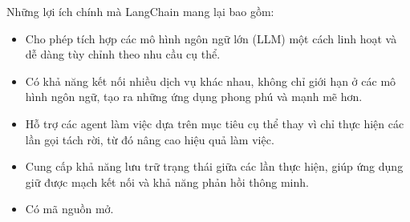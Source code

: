 Những lợi ích chính mà LangChain mang lại bao gồm:
\begin{itemize}
    \item Cho phép tích hợp các mô hình ngôn ngữ lớn (LLM) một cách linh hoạt và dễ dàng tùy chỉnh theo nhu cầu cụ thể.
    \item Có khả năng kết nối nhiều dịch vụ khác nhau, không chỉ giới hạn ở các mô hình ngôn ngữ, tạo ra những ứng dụng phong phú và mạnh mẽ hơn.
    \item Hỗ trợ các agent làm việc dựa trên mục tiêu cụ thể thay vì chỉ thực hiện các lần gọi tách rời, từ đó nâng cao hiệu quả làm việc.
    \item Cung cấp khả năng lưu trữ trạng thái giữa các lần thực hiện, giúp ứng dụng giữ được mạch kết nối và khả năng phản hồi thông minh.
    \item Có mã nguồn mở.
\end{itemize}












